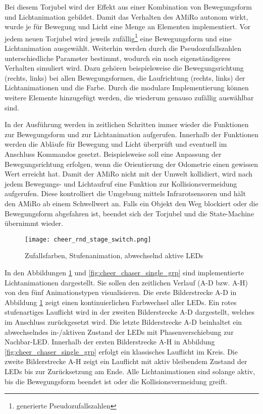 Bei diesem Torjubel wird der Effekt aus einer Kombination von Bewegungsform und Lichtanimation gebildet. Damit das Verhalten des AMiRo autonom wirkt, wurde je für Bewegung und Licht eine Menge an Elementen implementiert. Vor jedem neuen Torjubel wird jeweils zufällig\footnote{generierte Pseudozufallszahlen} eine Bewegungsform und eine Lichtanimation ausgewählt. Weiterhin werden durch die Pseudozufallszahlen unterschiedliche Parameter bestimmt, wodurch ein noch eigenständigeres Verhalten simuliert wird. Dazu gehören beispielsweise die Bewegungsrichtung (rechts, links) bei allen Bewegungsformen, die Laufrichtung (rechts, links) der Lichtanimationen und die Farbe. Durch die modulare Implementierung können weitere Elemente hinzugefügt werden, die wiederum genauso zufällig auswählbar sind.

In der Ausführung werden in zeitlichen Schritten immer wieder die Funktionen zur Bewegungsform und zur Lichtanimation aufgerufen. Innerhalb der Funktionen werden die Abläufe für Bewegung und Licht überprüft und eventuell im Anschluss Kommandos gesetzt. Beispielsweise soll eine Anpassung der Bewegungsrichtung erfolgen, wenn die Orientierung der Odometrie einen gewissen Wert erreicht hat. Damit der AMiRo nicht mit der Umwelt kollidiert, wird nach jedem Bewegungs- und Lichtaufruf eine Funktion zur Kollisionsvermeidung aufgerufen. Diese kontrolliert die Umgebung mittels Infrarotsensoren und hält den AMiRo ab einem Schwellwert an. Falls ein Objekt den Weg blockiert oder die Bewegungsform abgefahren ist, beendet sich der Torjubel und die State-Machine übernimmt wieder.

\begin{figure}[H]
	\begin{center}
		\texttt{[image: cheer\_rnd\_stage\_switch.png]} 	
		\caption{Zufallsfarben, Stufenanimation, abwechselnd aktive LEDs}
		\label{fig:cheer_rnd_stage_switch}
	\end{center}
\end{figure}

In den Abbildungen \ref{fig:cheer_rnd_stage_switch} und \ref{fig:cheer_chaser_single_grp} sind implementierte Lichtanimationen dargestellt. Sie sollen den zeitlichen Verlauf (A-D bzw. A-H) von den fünf Animationstypen visualisieren. Die erste Bilderstrecke A-D in Abbildung \ref{fig:cheer_rnd_stage_switch} zeigt einen kontinuierlichen Farbwechsel aller LEDs. Ein rotes stufenartiges Lauflicht wird in der zweiten Bilderstrecke A-D dargestellt, welches im Anschluss zurückgesetzt wird. Die letzte Bilderstrecke A-D beinhaltet ein abwechselndes in-/aktiven Zustand der LEDs mit Phasenverschiebung zur Nachbar-LED.
Innerhalb der ersten Bilderstrecke A-H in Abbildung \ref{fig:cheer_chaser_single_grp} erfolgt ein klassisches Lauflicht im Kreis. Die zweite Bilderstrecke A-H zeigt ein Lauflicht mit aktiv bleibendem Zustand der LEDs bis zur Zurücksetzung am Ende. Alle Lichtanimationen sind solange aktiv, bis die Bewegungsform beendet ist oder die Kollisionsvermeidung greift.

